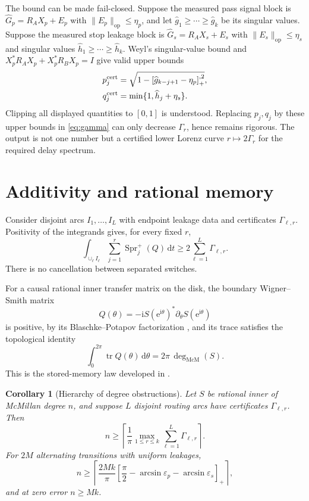 \documentclass[11pt]{article}
\newtheorem{corollary}[theorem]{Corollary}
\theoremstyle{definition}
\theoremstyle{remark}
\newcommand{\tr}{\operatorname{tr}}
\newcommand{\dd}{\mathrm d}
\newcommand{\e}{\mathrm e}
\newcommand{\Spr}{\operatorname{Spr}^{+}}
\newcommand{\mcdeg}{\deg_{\mathrm{McM}}}
\newcommand{\opnorm}[1]{\lVert#1\rVert_{\mathrm{op}}}
\newcommand{\pos}[1]{\left[#1\right]_{+}}
\begin{document}
The bound can be made fail-closed.  Suppose the measured pass signal block is
$\widehat G_p=R_AX_p+E_p$ with $\opnorm{E_p}\leq\eta_p$, and let
$\widehat g_1\geq\cdots\geq\widehat g_k$ be its singular values.  Suppose the
measured stop leakage block is $\widehat G_s=R_AX_s+E_s$ with
$\opnorm{E_s}\leq\eta_s$ and singular values
$\widehat h_1\geq\cdots\geq\widehat h_k$.  Weyl's singular-value bound and
$X_p^*R_AX_p+X_p^*R_BX_p=I$ give valid upper bounds
\begin{align}
 p_j^{\rm cert}
 &=\sqrt{1-\pos{\widehat g_{k-j+1}-\eta_p}^{,2}},\label{eq:pcert}\\
 q_j^{\rm cert}
 &=\min\{1,\widehat h_j+\eta_s\}.\label{eq:qcert}
\end{align}
Clipping all displayed quantities to $[0,1]$ is understood.  Replacing
$p_j,q_j$ by these upper bounds in \eqref{eq:gamma} can only decrease
$\Gamma_r$, hence remains rigorous.  The output is not one number but a
certified lower Lorenz curve $r\mapsto2\Gamma_r$ for the required delay
spectrum.

\section{Additivity and rational memory}

Consider disjoint arcs $I_1,\ldots,I_L$ with endpoint leakage data and
certificates $\Gamma_{\ell,r}$.  Positivity of the integrands gives, for every
fixed $r$,
\begin{equation}\label{eq:additive}
 \int_{\cup_\ell I_\ell}\sum_{j=1}^r\Spr_j(Q)\,\dd t
 \geq2\sum_{\ell=1}^L\Gamma_{\ell,r}.
\end{equation}
There is no cancellation between separated switches.

For a causal rational inner transfer matrix on the disk, the boundary
Wigner--Smith matrix
\[
 Q(\theta)=-\mathrm iS(\e^{\mathrm i\theta})^*
 \partial_\theta S(\e^{\mathrm i\theta})
\]
is positive, by its Blaschke--Potapov factorization
\cite{Potapov1955,AlpayJorgensenLewkowicz2016}, and its trace satisfies the
topological identity
\begin{equation}\label{eq:degreeidentity}
 \int_0^{2\pi}\tr Q(\theta)\,\dd\theta
 =2\pi\,\mcdeg(S).
\end{equation}
This is the stored-memory law developed in \cite{ErikssonMemory2026}.

\begin{corollary}[Hierarchy of degree obstructions]\label{cor:degree}
Let $S$ be rational inner of McMillan degree $n$, and suppose $L$ disjoint
routing arcs have certificates $\Gamma_{\ell,r}$.  Then
\begin{equation}\label{eq:degree}
 \boxed{\quad
 n\geq
 \left\lceil\frac1\pi
 \max_{1\leq r\leq k}\sum_{\ell=1}^L\Gamma_{\ell,r}
 \right\rceil .\quad}
\end{equation}
For $2M$ alternating transitions with uniform leakages,
\begin{equation}
 n\geq\left\lceil\frac{2Mk}{\pi}
 \pos{\frac\pi2-\arcsin\varepsilon_p-\arcsin\varepsilon_s}\right\rceil,
\end{equation}
and at zero error $n\geq Mk$.
\end{corollary}
\end{document}
